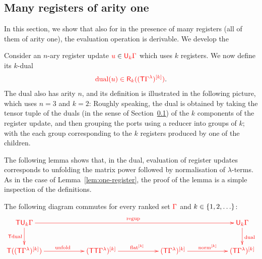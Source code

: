 \subsection{Many registers of arity one}
\label{sec:many-registers-subsect}

In this section, we show that also for in the presence of many registers (all of them of arity one), the evaluation operation is derivable.  We develop the 

Consider an $n$-ary register update ${\color{red}{u}} \in {\color{red}{\mathsf{U}_{k}\Gamma}}$ which uses $k$ registers. We now define its $k$-dual
\begin{align*}
{\color{red}{ {\color{red}{\mathrm{dual}}}(u) \in {\color{red}{\mathsf R_{k}}}(({\color{red}{\mathsf T}}{\color{red}{\Gamma}}^\lambda)^{[k]})}}.
\end{align*}
The dual also has arity $n$, and its definition is illustrated in the following picture, which uses $n=3$ and $k=2$:
Roughly speaking, the dual is obtained by taking the tensor tuple of the duals (in the sense of Section~\ref{sec:many-registers-subsect}) of the $k$ components of the register update, and then grouping the ports using a reducer into groups of $k$; with the each group corresponding to the $k$ registers produced by one of the children. 

The following lemma shows that, in the dual, evaluation of register updates corresponds to unfolding the matrix power followed by normalisation of $\lambda$-terms. As in the case of Lemma~\ref{lem:one-register}, the proof of the lemma is a simple inspection of the definitions. 
\begin{lemma}\label{lem:many-register}
    The following diagram commutes for every ranked set ${\color{red}{\Gamma}}$ and $k \in \{1,2,\ldots\}$:
        \begin{align*}\ranked{
            \xymatrix@C=2cm{ 
              \tmonad  \regup \rGamma k  \ar[d]_-{\tmonad \dualt} \ar[rrr]^{\regupt} & &&
              \regup \rGamma k   \ar[d]^{\dualt}
              \\
              \tmonad (\matrixpower  {(\tmonad \rGamma^\lambda)}  k) \ar[r]^{\unfold} &\matrixpower  {(\tmonad \tmonad \rGamma^\lambda)}  k \ar[r]^{\matrixpower \flatt k} &
              \ar[r]^{\matrixpower \normt k}  \matrixpower  {( \tmonad \rGamma^\lambda)}  k
                  & \matrixpower  {( \tmonad \rGamma^\lambda)}  k  
            }}
            \end{align*}
\end{lemma}


